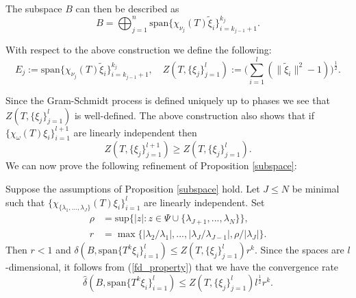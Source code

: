 \documentclass[a4paper,10pt]{article}
\begin{document}
The subspace $B$ can then be described as
$$
B = \bigoplus_{j=1}^n \mathrm{span}\{\chi_{\nu_j}(T)
\tilde\xi_{i}\}_{i=k_{j-1}+1}^{k_j}. 
$$
\begin{definition}
With respect to the above construction we define the following:
\begin{equation}
\label{need_ejs}
E_j :=\mathrm{span}\{\chi_{\nu_j}(T)\tilde\xi_{i}\}_{i = k_{j-1}+1}^{k_j},\quad Z(T,\{\xi_j\}_{j=1}^l):=\Big(\sum_{i=1}^{l}(\|\tilde \xi_i\|^2-1)\Big)^{\frac{1}{2}}.
\end{equation}
\end{definition}

Since the Gram-Schmidt process is defined uniquely up to phases we see that $Z(T,\{\xi_j\}_{j=1}^l)$ is well-defined. The above construction also shows that if $\{\chi_{\omega}(T)\xi_i\}_{i=1}^{l+1}$ are linearly independent then
$$Z(T,\{\xi_j\}_{j=1}^{l+1})\geq Z(T,\{\xi_j\}_{j=1}^l).$$
We can now prove the following refinement of Proposition \ref{subspace}:

\begin{proposition}
\label{rate_extension}
Suppose the assumptions of Proposition \ref{subspace} hold. Let $J\leq N$ be minimal such that $\{\chi_{\{\lambda_1,...,\lambda_J\}}(T)\xi_i\}_{i=1}^l$ are linearly independent. Set
\begin{align*}
\rho&=\mathrm{sup}\{\left|z\right|:z\in\Psi\cup\{\lambda_{J+1},...,\lambda_N\}\},\\
r&=\max\{\left|\lambda_2/\lambda_1\right|,...,\left|\lambda_J/\lambda_{J-1}\right|,\rho/\left|\lambda_J\right|\}.
\end{align*}
Then $r<1$ and ${\delta}(B,\mathrm{span}\{T^k\xi_i\}_{i=1}^l)\leq Z(T,\{\xi_j\}_{j=1}^l)r^k$. Since the spaces are $l$-dimensional, it follows from (\ref{fd_property}) that we have the convergence rate
$$
\hat{\delta}(B,\mathrm{span}\{T^k\xi_i\}_{i=1}^l)\leq Z(T,\{\xi_j\}_{j=1}^l)l^{\frac{1}{2}}r^k.$$
\end{proposition}
\end{document}
